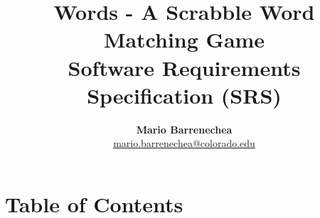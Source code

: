 \documentclass [11pt] {article}
\begin{document}
\title {\textbf{Words - A Scrabble Word Matching Game} \\ Software Requirements Specification (SRS)}
\author {\textbf{Mario Barrenechea} \\ \href{mailto:mario.barrenechea@colorado.edu}{mario.barrenechea@colorado.edu}}
\maketitle

\begin {abstract} \label{abs.}
\end {abstract}

\section {Table of Contents}
\end{document}
